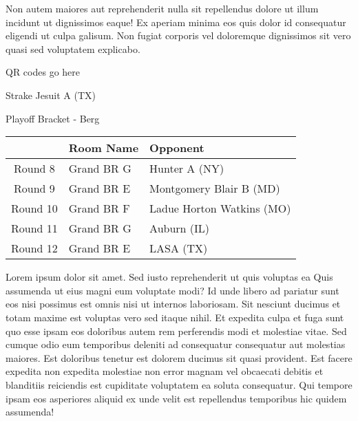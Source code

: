 \documentclass{article}%
\begin{document}
\newline%
Non autem maiores aut reprehenderit nulla sit repellendus dolore ut illum incidunt ut dignissimos eaque! Ex aperiam minima eos quis dolor id consequatur eligendi ut culpa galisum. Non fugiat corporis vel doloremque dignissimos sit vero quasi sed voluptatem explicabo.\newline%
\newline%
%
\vspace*{30pt}%
\begin{center}%
\begin{Huge}%
QR codes go here%
\end{Huge}%
\end{center}%
\newpage%
\begin{center}%
\begin{Huge}%
Strake Jesuit A (TX)%
\end{Huge}%
\vspace*{8pt}%
\linebreak%
\begin{Large}%
Playoff Bracket {-} Berg%
\end{Large}%
\end{center}%
\begin{tabularx}{\textwidth}{|c|Y|Y|}%
\hline%
&Room Name&Opponent\\%
\hline%
Round 8&Grand BR G&Hunter A (NY)\\%
Round 9&Grand BR E&Montgomery Blair B (MD)\\%
Round 10&Grand BR F&Ladue Horton Watkins (MO)\\%
Round 11&Grand BR G&Auburn (IL)\\%
Round 12&Grand BR E&LASA (TX)\\%
\hline%
\end{tabularx}%
\vspace*{8pt}%
\linebreak%
\newline%
\newline%
Lorem ipsum dolor sit amet. Sed iusto reprehenderit ut quis voluptas ea Quis assumenda ut eius magni eum voluptate modi? Id unde libero ad pariatur sunt eos nisi possimus est omnis nisi ut internos laboriosam. Sit nesciunt ducimus et totam maxime est voluptas vero sed itaque nihil. Et expedita culpa et fuga sunt quo esse ipsam eos doloribus autem rem perferendis modi et molestiae vitae.\newline%
\newline%
Sed cumque odio eum temporibus deleniti ad consequatur consequatur aut molestias maiores. Est doloribus tenetur est dolorem ducimus sit quasi provident. Est facere expedita non expedita molestiae non error magnam vel obcaecati debitis et blanditiis reiciendis est cupiditate voluptatem ea soluta consequatur. Qui tempore ipsam eos asperiores aliquid ex unde velit est repellendus temporibus hic quidem assumenda!\newline%
\end{document}
